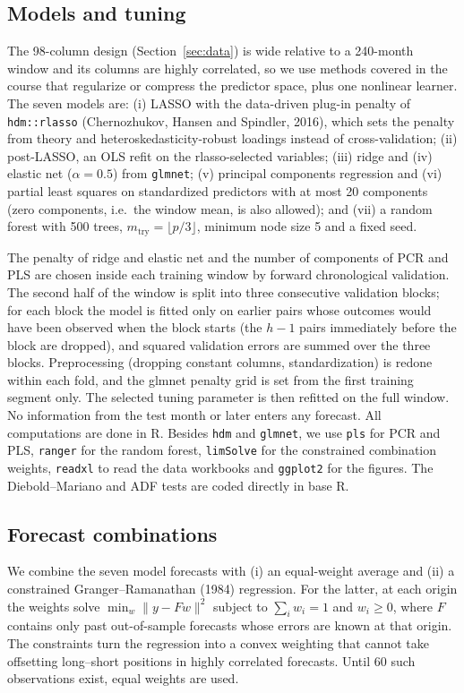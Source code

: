 \documentclass[11pt,a4paper]{article}
\begin{document}
\subsection{Models and tuning}\label{sec:method:models}
The 98-column design (Section~\ref{sec:data}) is wide relative to a
240-month window and its columns are highly correlated, so we use methods covered in the course that regularize
or compress the predictor space, plus one nonlinear learner. The seven
models are: (i) LASSO with the data-driven plug-in penalty of
\texttt{hdm::rlasso} (Chernozhukov, Hansen and Spindler, 2016), which sets
the penalty from theory and heteroskedasticity-robust loadings instead of
cross-validation; (ii) post-LASSO, an OLS refit on the rlasso-selected
variables; (iii) ridge and (iv) elastic net ($\alpha=0.5$) from
\texttt{glmnet}; (v) principal components regression and (vi) partial
least squares on standardized predictors with at most 20 components (zero
components, i.e.\ the window mean, is also allowed); and (vii) a random
forest with 500 trees, $m_{\mathrm{try}}=\lfloor p/3\rfloor$, minimum node
size 5 and a fixed seed.

The penalty of ridge and elastic net and the number of components of PCR
and PLS are chosen inside each training window by forward chronological
validation. The second half of the window is split into three consecutive
validation blocks; for each block the model is fitted only on earlier pairs
whose outcomes would have been observed when the block starts (the $h-1$
pairs immediately before the block are dropped), and squared validation
errors are summed over the three blocks.
Preprocessing (dropping constant columns, standardization) is redone within
each fold, and the glmnet penalty grid is set from the first training
segment only. The selected tuning parameter is then refitted on the full
window. No information from the test month or later enters any forecast.
All computations are done in R. Besides \texttt{hdm} and \texttt{glmnet},
we use \texttt{pls} for PCR and PLS, \texttt{ranger} for the random forest,
\texttt{limSolve} for the constrained combination weights, \texttt{readxl}
to read the data workbooks and \texttt{ggplot2} for the figures. The
Diebold--Mariano and ADF tests are coded directly in base R.

\subsection{Forecast combinations}\label{sec:method:combos}
We combine the seven model forecasts with (i) an equal-weight average and
(ii) a constrained Granger--Ramanathan (1984) regression. For the latter,
at each origin the weights solve $\min_w \|y-Fw\|^2$ subject to
$\sum_i w_i=1$ and $w_i\ge0$, where $F$ contains only past out-of-sample
forecasts whose errors are known at that origin. The constraints turn the
regression into a convex weighting that cannot take offsetting long--short
positions in highly correlated forecasts. Until 60 such observations exist,
equal weights are used.
\end{document}
